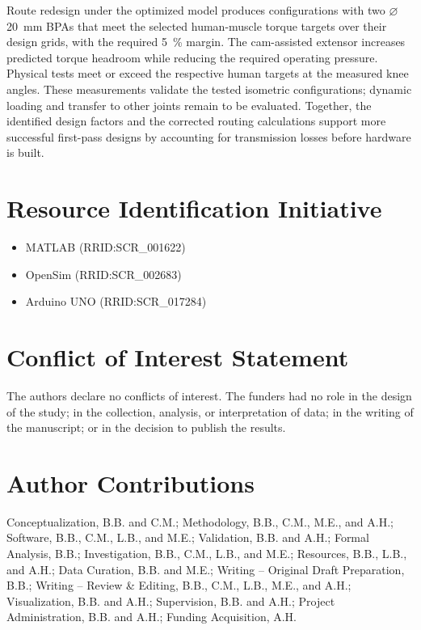 \documentclass[utf8]{FrontiersinHarvard} %
\begin{document}
Route redesign under the optimized model produces configurations with two $\diameter$\qty{20}{\mm} BPAs that meet the selected human-muscle torque targets over their design grids, with the required \qty{5}{\percent} margin. The cam-assisted extensor increases predicted torque headroom while reducing the required operating pressure. Physical tests meet or exceed the respective human targets at the measured knee angles. These measurements validate the tested isometric configurations; dynamic loading and transfer to other joints remain to be evaluated. Together, the identified design factors and the corrected routing calculations support more successful first-pass designs by accounting for transmission losses before hardware is built.

\section*{Resource Identification Initiative}
\begin{itemize}
    \item MATLAB (RRID:SCR\_001622)
    \item OpenSim (RRID:SCR\_002683)
    \item Arduino UNO (RRID:SCR\_017284)
\end{itemize}



\section*{Conflict of Interest Statement}
The authors declare no conflicts of interest. The funders had no role in the design of the study; in the collection, analysis, or interpretation of data; in the writing of the manuscript; or in the decision to publish the results.

\section*{Author Contributions}
Conceptualization, B.B. and C.M.; Methodology, B.B., C.M., M.E., and A.H.; Software, B.B., C.M., L.B., and M.E.; Validation, B.B. and A.H.; Formal Analysis, B.B.; Investigation, B.B., C.M., L.B., and M.E.; Resources, B.B., L.B., and A.H.; Data Curation, B.B. and M.E.; Writing -- Original Draft Preparation, B.B.; Writing -- Review \& Editing, B.B., C.M., L.B., M.E., and A.H.; Visualization, B.B. and A.H.; Supervision, B.B. and A.H.; Project Administration, B.B. and A.H.; Funding Acquisition, A.H.
\end{document}
